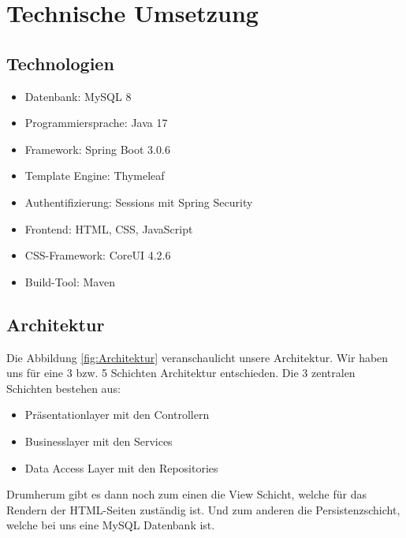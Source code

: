 \documentclass[12pt, letterpaper]{article}
\begin{document}
    \newpage
    \section{Technische Umsetzung}

    \subsection{Technologien}

    \begin{itemize}
        \item Datenbank: MySQL 8
        \item Programmiersprache: Java 17
        \item Framework: Spring Boot 3.0.6
        \item Template Engine: Thymeleaf
        \item Authentifizierung: Sessions mit Spring Security
        \item Frontend: HTML, CSS, JavaScript
        \item CSS-Framework: CoreUI 4.2.6
        \item Build-Tool: Maven
    \end{itemize}

    \newpage
    \subsection{Architektur}

    Die Abbildung \ref{fig:Architektur} veranschaulicht unsere Architektur. Wir haben uns für eine 3 bzw. 5 Schichten Architektur entschieden.
    Die 3 zentralen Schichten bestehen aus:
    \begin{itemize}
        \item Präsentationlayer mit den Controllern
        \item Businesslayer mit den Services
        \item Data Access Layer mit den Repositories
    \end{itemize}

    Drumherum gibt es dann noch zum einen die View Schicht, welche für das Rendern der HTML-Seiten zuständig ist. Und zum anderen
    die Persistenzschicht, welche bei uns eine MySQL Datenbank ist.
\end{document}
